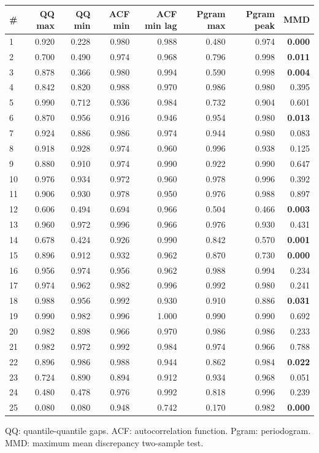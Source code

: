 \documentclass[11pt,a4paper]{article}
\begin{document}
\begin{center}
\begin{tabular}{lrrrrrrr}
\toprule
\# & QQ max & QQ min & ACF min & ACF min lag & Pgram max & Pgram peak & MMD \\
\midrule
1 & 0.920 & 0.228 & 0.980 & 0.988 & 0.480 & 0.974 & \textbf{0.000} \\
2 & 0.700 & 0.490 & 0.974 & 0.968 & 0.796 & 0.998 & \textbf{0.011} \\
3 & 0.878 & 0.366 & 0.980 & 0.994 & 0.590 & 0.998 & \textbf{0.004} \\
4 & 0.842 & 0.820 & 0.988 & 0.970 & 0.986 & 0.980 & 0.395 \\
5 & 0.990 & 0.712 & 0.936 & 0.984 & 0.732 & 0.904 & 0.601 \\
6 & 0.870 & 0.956 & 0.916 & 0.946 & 0.954 & 0.980 & \textbf{0.013} \\
7 & 0.924 & 0.886 & 0.986 & 0.974 & 0.944 & 0.980 & 0.083 \\
8 & 0.918 & 0.928 & 0.974 & 0.960 & 0.996 & 0.938 & 0.125 \\
9 & 0.880 & 0.910 & 0.974 & 0.990 & 0.922 & 0.990 & 0.647 \\
10 & 0.976 & 0.934 & 0.972 & 0.960 & 0.978 & 0.996 & 0.392 \\
11 & 0.906 & 0.930 & 0.978 & 0.950 & 0.976 & 0.988 & 0.897 \\
12 & 0.606 & 0.494 & 0.694 & 0.966 & 0.504 & 0.466 & \textbf{0.003} \\
13 & 0.960 & 0.972 & 0.996 & 0.966 & 0.976 & 0.930 & 0.431 \\
14 & 0.678 & 0.424 & 0.926 & 0.990 & 0.842 & 0.570 & \textbf{0.001} \\
15 & 0.896 & 0.912 & 0.932 & 0.962 & 0.870 & 0.730 & \textbf{0.000} \\
16 & 0.956 & 0.974 & 0.956 & 0.962 & 0.988 & 0.994 & 0.234 \\
17 & 0.974 & 0.962 & 0.982 & 0.996 & 0.992 & 0.980 & 0.241 \\
18 & 0.988 & 0.956 & 0.992 & 0.930 & 0.910 & 0.886 & \textbf{0.031} \\
19 & 0.990 & 0.982 & 0.996 & 1.000 & 0.990 & 0.990 & 0.692 \\
20 & 0.982 & 0.898 & 0.966 & 0.970 & 0.986 & 0.986 & 0.233 \\
21 & 0.982 & 0.972 & 0.992 & 0.984 & 0.974 & 0.966 & 0.788 \\
22 & 0.896 & 0.986 & 0.988 & 0.944 & 0.862 & 0.984 & \textbf{0.022} \\
23 & 0.724 & 0.890 & 0.894 & 0.912 & 0.934 & 0.968 & 0.051 \\
24 & 0.480 & 0.478 & 0.976 & 0.992 & 0.818 & 0.996 & 0.239 \\
25 & 0.080 & 0.080 & 0.948 & 0.742 & 0.170 & 0.982 & \textbf{0.000} \\
\bottomrule
\end{tabular}
\end{center}

QQ: quantile-quantile gaps. ACF: autocorrelation function. Pgram: periodogram. MMD: maximum mean discrepancy two-sample test.
\end{document}
